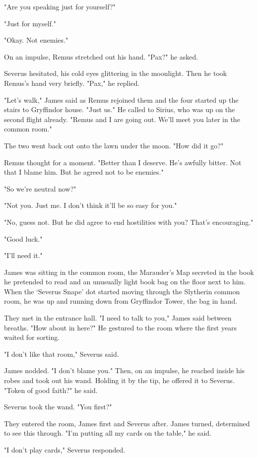 "Are you speaking just for yourself?"

"Just for myself."

"Okay. Not enemies."

On an impulse, Remus stretched out his hand. "Pax?" he asked.

Severus hesitated, his cold eyes glittering in the moonlight. Then he took Remus's hand very briefly. "Pax," he replied.

"Let's walk," James said as Remus rejoined them and the four started up the stairs to Gryffindor house. "Just us." He called to Sirius, who was up on the second flight already. "Remus and I are going out. We'll meet you later in the common room."

The two went back out onto the lawn under the moon. "How did it go?"

Remus thought for a moment. "Better than I deserve. He's awfully bitter. Not that I blame him. But he agreed not to be enemies."

"So we're neutral now?"

"Not you. Just me. I don't think it'll be so easy for you."

"No, guess not. But he did agree to end hostilities with you? That's encouraging."

"Good luck."

"I'll need it."

James was sitting in the common room, the Marauder's Map secreted in the book he pretended to read and an unusually light book bag on the floor next to him. When the `Severus Snape' dot started moving through the Slytherin common room, he was up and running down from Gryffindor Tower, the bag in hand.

They met in the entrance hall. "I need to talk to you," James said between breaths. "How about in here?" He gestured to the room where the first years waited for sorting.

"I don't like that room," Severus said.

James nodded. "I don't blame you." Then, on an impulse, he reached inside his robes and took out his wand. Holding it by the tip, he offered it to Severus. "Token of good faith?" he said.

Severus took the wand. "You first?"

They entered the room, James first and Severus after. James turned, determined to see this through. "I'm putting all my cards on the table," he said.

"I don't play cards," Severus responded.


